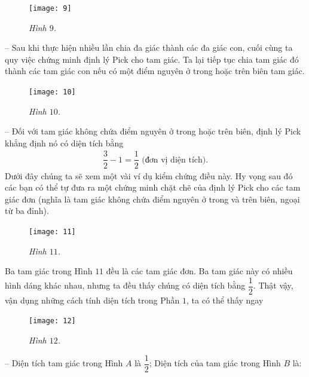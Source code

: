 \begin{multicols}{2}
	\begin{figure}[H]
		\vspace*{-5pt}
		\centering
		\captionsetup{labelformat= empty, justification=centering}
		\texttt{[image: 9]}
		\caption{\small\textit{\color{toancuabi}Hình $9$.}}
		\vspace*{-10pt}
	\end{figure}
	-- Sau khi thực hiện nhiều lần chia đa giác thành các đa giác con, cuối cùng ta quy việc chứng minh định lý Pick cho tam giác. Ta lại tiếp tục chia tam giác đó thành các tam giác con nếu có một điểm nguyên ở trong hoặc trên biên tam giác. 
	\begin{figure}[H]
		\vspace*{5pt}
		\centering
		\captionsetup{labelformat= empty, justification=centering}
		\texttt{[image: 10]}
		\caption{\small\textit{\color{toancuabi}Hình $10$.}}
		\vspace*{-10pt}
	\end{figure}
	-- Đối với tam giác không chứa điểm nguyên ở trong hoặc trên biên, định lý Pick khẳng định nó có diện tích bằng
	\begin{align*}
		\dfrac{3}{2}-1=\dfrac{1}{2} \text{ (đơn vị diện tích).}
	\end{align*}
	Dưới đây chúng ta sẽ xem một vài ví dụ kiểm chứng điều này. Hy vọng sau đó các bạn có thể tự đưa ra một chứng minh chặt chẽ của định lý Pick cho các tam giác đơn (nghĩa là tam giác không chứa điểm nguyên ở trong và trên biên, ngoại từ ba đỉnh).
	\begin{figure}[H]
		\vspace*{-5pt}
		\centering
		\captionsetup{labelformat= empty, justification=centering}
		\texttt{[image: 11]}
		\caption{\small\textit{\color{toancuabi}Hình $11$.}}
		\vspace*{-10pt}
	\end{figure}
	Ba tam giác trong Hình $11$ đều là các tam giác đơn. Ba tam giác này có nhiều hình dáng khác nhau, nhưng ta đều thấy chúng có diện tích bằng $\dfrac{1}{2}$.
	Thật vậy, vận dụng những cách tính diện tích trong Phần $1$, ta có thể thấy ngay
	\begin{figure}[H]
		\vspace*{-5pt}
		\centering
		\captionsetup{labelformat= empty, justification=centering}
		\texttt{[image: 12]}
		\caption{\small\textit{\color{toancuabi}Hình $12$.}}
		\vspace*{-10pt}
	\end{figure}
	-- Diện tích tam giác trong Hình $A$ là $\dfrac{1}{2}$;
	\vskip 0.1cm
	Diện tích của tam giác trong Hình $B$ là: 

\end{multicols}
